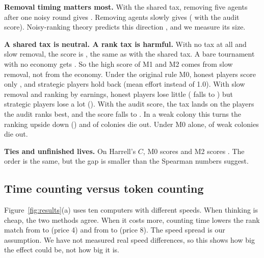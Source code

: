 \documentclass[conference]{IEEEtran}
\theoremstyle{plain}
\begin{document}
\textbf{Removal timing matters most.} With the shared tax, removing five agents after one noisy round gives \NVLinCull{}. Removing agents slowly gives \NVLinGrad{} (\NVLinGradAudit{} with the audit score). Noisy-ranking theory predicts this direction \cite{jamieson2015halving}, and we measure its size.

\textbf{A shared tax is neutral. A rank tax is harmful.} With no tax at all and slow removal, the score is \NVLinGradAudit{}, the same as with the shared tax. A bare tournament with no economy gets \NVBare{}. So the high score of M1 and M2 comes from slow removal, not from the economy. Under the original rule M0, honest players score only \NVMzeroH{}, and strategic players hold back (mean effort \NMidEffMyopic{} instead of 1.0). With slow removal and ranking by earnings, honest players lose little (\NVLinGrad{} falls to \NVRankGradGrossH{}) but strategic players lose a lot (\NVRankGradGrossS{}). With the audit score, the tax lands on the players the audit ranks best, and the score falls to \NVRankGradAuditH{}. In a weak colony this turns the ranking upside down (\NVWeakInverted{}) and \NExtWeakInverted{} of colonies die out. Under M0 alone, \NExtWeakMzero{} of weak colonies die out.

\textbf{Ties and unfinished lives.} On Harrell's $C$, M0 scores \NCMzeroH{} and M2 scores \NCMtwoH{}. The order is the same, but the gap is smaller than the Spearman numbers suggest.

\subsection{Time counting versus token counting}
Figure~\ref{fig:results}(a) uses ten computers with different speeds. When thinking is cheap, the two methods agree. When it costs more, counting time lowers the rank match from \NHwTokFour{} to \NHwTimeFour{} (price 4) and from \NHwTokEight{} to \NHwTimeEight{} (price 8). The speed spread is our assumption. We have not measured real speed differences, so this shows how big the effect could be, not how big it is.
\end{document}
